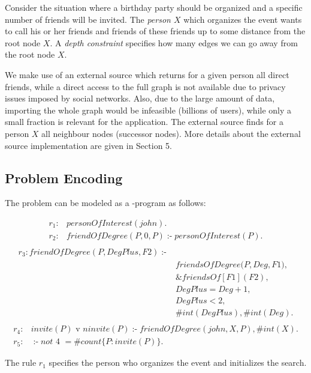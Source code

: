 \documentclass[14pt,a4paper, titlepage]{article}
\newcommand{\ext}[3]{\ensuremath{\&{#1}[#2](#3)}}
\DeclareMathOperator{\leftimpl}{:-}
\begin{document}
Consider the situation where a birthday party should be organized and a specific number of friends will
 be invited. The \emph{person $X$} which organizes the event wants to call his or her friends and friends of these friends up to some distance from the root node $X$. A \emph{depth constraint} specifies how many edges we can go away from the root node $X$.
 

We make use of an external source which returns for a given person all direct friends, while a direct access to the full graph is not available due to privacy issues imposed by social networks. Also, due to the large amount of data, importing the whole graph would be infeasible (billions of users), while only a small fraction is relevant for the application. The external source finds for a person $X$ all neighbour nodes (successor nodes). More details about the external source implementation are given in Section 5. 
               

\subsection{Problem Encoding}
The problem can be modeled as a \hex{}-program as follows:
\begin{exmp}
\begin{align*}
r_1\colon & \mathit{personOfInterest}(\mathit{john}). \\
r_2\colon & \mathit{friendOfDegree}(\mathit{P, 0, P}) \leftimpl  \mathit{personOfInterest}(P).\\
\end{align*}
\begin{align*}
r_{3}\colon \mathit{friendOfDegree}(\mathit{P, DegPlus, F2}) \leftimpl & \\  
& \mathit{friendsOfDegree}(\mathit{P,Deg,F1)},\\
& \ext{friendsOf}{F1}{F2},\\ 
& \mathit{DegPlus = Deg + 1}, \\
& \mathit{DegPlus < 2},\\
& \mathit{\#int(DegPlus)}, \mathit{\#int(Deg)}.\\
\end{align*}
\begin{align*}
r_{4}\colon & \mathit{invite(P)} \text{ v } \mathit{ninvite(P) \leftimpl  friendOfDegree(john,X,P), \#int(X).}\\
r_{5}\colon & \leftimpl   \mathit{not} \text{ 4 } = \mathit{\#count} \{ P : \mathit{invite(P)} \}.
\end{align*}
\end{exmp}
The rule $r_1$ specifies the person who organizes the event and initializes the search. 
\end{document}
